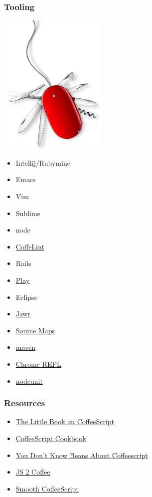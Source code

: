 \documentclass{beamer}
\begin{document}
\begin{frame}
  \frametitle{Tooling}
    \includegraphics[scale=.40]{tooling}
  \begin{multicols}{2}
  \begin{itemize}
    \item Intellij/Rubymine
    \item Emacs
    \item Vim
    \item Sublime
    \item node
    \item \href{http://www.coffeelint.org/}{CoffeLint}
    \item Rails
    \item \href{http://www.playframework.com/documentation/2.0/AssetsCoffeeScript}{Play}
    \item Eclipse
    \item \href{https://jawr.java.net/}{Jawr}
    \item
      \href{http://www.html5rocks.com/en/tutorials/developertools/sourcemaps/}{Source
      Maps}
    \item \href{https://github.com/talios/coffee-maven-plugin}{maven}
    \item 
      \href{https://chrome.google.com/webstore/detail/coffeereplconsole/eoifmnkmfmjellmlicakeocfjmhdjgfl}{Chrome
        REPL}
    \item \href{https://github.com/caolan/nodeunit}{nodeunit}

  \end{itemize}
\end{multicols}
\end{frame}

\begin{frame}
  \frametitle{Resources}
  \begin{itemize}
    \item \href{http://arcturo.github.io/library/coffeescript/}{The
        Little Book on CoffeeScript}
    \item \href{http://www.coffeescriptcookbook.com}{CoffeeScript Cookbook}
    \item \href{http://aseemk.com/talks/intro-to-coffeescript}{You
        Don\rq t Know Beans About Coffeescript}
    \item \href{http://js2coffee.org/}{JS 2 Coffee}
    \item
      \href{http://autotelicum.github.io/Smooth-CoffeeScript/}{Smooth CoffeeScript}
  \end{itemize}
\end{frame}
\end{document}
